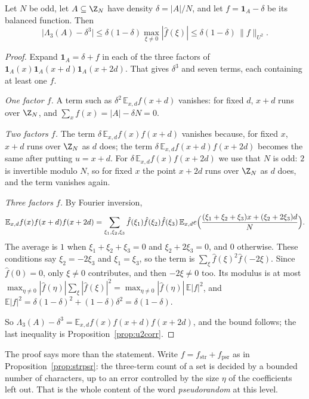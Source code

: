 \begin{theorem}\label{thm:u2count}
Let $N$ be odd, let $A\subseteq\Z_N$ have density $\delta=|A|/N$, and let $f=\mathbf 1_A-\delta$ be its balanced function. Then
\[
\bigl|\Lambda_3(A)-\delta^3\bigr|\le\delta(1-\delta)\max_{\xi\ne0}|\hat f(\xi)|\le\delta(1-\delta)\,\|f\|_{U^2}.
\]
\end{theorem}
\begin{proof}
Expand $\mathbf 1_A=\delta+f$ in each of the three factors of $\mathbf 1_A(x)\mathbf 1_A(x+d)\mathbf 1_A(x+2d)$. That gives $\delta^3$ and seven terms, each containing at least one $f$.

\emph{One factor $f$.} A term such as $\delta^2\,\mathbb E_{x,d}f(x+d)$ vanishes: for fixed $d$, $x+d$ runs over $\Z_N$, and $\sum_xf(x)=|A|-\delta N=0$.

\emph{Two factors $f$.} The term $\delta\,\mathbb E_{x,d}f(x)f(x+d)$ vanishes because, for fixed $x$, $x+d$ runs over $\Z_N$ as $d$ does; the term $\delta\,\mathbb E_{x,d}f(x+d)f(x+2d)$ becomes the same after putting $u=x+d$. For $\delta\,\mathbb E_{x,d}f(x)f(x+2d)$ we use that $N$ is odd: $2$ is invertible modulo $N$, so for fixed $x$ the point $x+2d$ runs over $\Z_N$ as $d$ does, and the term vanishes again.

\emph{Three factors $f$.} By Fourier inversion,
\[
\mathbb E_{x,d}f(x)f(x+d)f(x+2d)=\sum_{\xi_1,\xi_2,\xi_3}\hat f(\xi_1)\hat f(\xi_2)\hat f(\xi_3)\,\mathbb E_{x,d}e\Bigl(\frac{(\xi_1+\xi_2+\xi_3)x+(\xi_2+2\xi_3)d}N\Bigr).
\]
The average is $1$ when $\xi_1+\xi_2+\xi_3=0$ and $\xi_2+2\xi_3=0$, and $0$ otherwise. These conditions say $\xi_2=-2\xi_3$ and $\xi_1=\xi_3$, so the term is $\sum_\xi\hat f(\xi)^2\hat f(-2\xi)$. Since $\hat f(0)=0$, only $\xi\ne0$ contributes, and then $-2\xi\ne0$ too. Its modulus is at most $\max_{\eta\ne0}|\hat f(\eta)|\sum_\xi|\hat f(\xi)|^2=\max_{\eta\ne0}|\hat f(\eta)|\,\mathbb E|f|^2$, and $\mathbb E|f|^2=\delta(1-\delta)^2+(1-\delta)\delta^2=\delta(1-\delta)$.

So $\Lambda_3(A)-\delta^3=\mathbb E_{x,d}f(x)f(x+d)f(x+2d)$, and the bound follows; the last inequality is Proposition~\ref{prop:u2corr}.
\end{proof}

The proof says more than the statement. Write $f=f_{\mathrm{str}}+f_{\mathrm{psr}}$ as in Proposition~\ref{prop:strpsr}: the three-term count of a set is decided by a bounded number of characters, up to an error controlled by the size $\eta$ of the coefficients left out. That is the whole content of the word \emph{pseudorandom} at this level.

